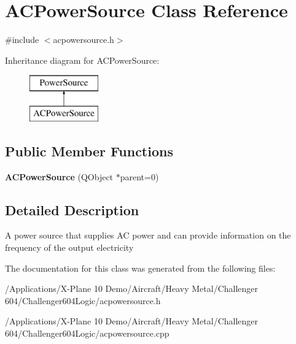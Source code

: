 \hypertarget{class_a_c_power_source}{\section{A\-C\-Power\-Source Class Reference}
\label{class_a_c_power_source}
}


{\ttfamily \#include $<$acpowersource.\-h$>$}

Inheritance diagram for A\-C\-Power\-Source\-:\begin{figure}[H]
\begin{center}
\leavevmode
\includegraphics[height=2.000000cm]{class_a_c_power_source}
\end{center}
\end{figure}
\subsection*{Public Member Functions}
\begin{DoxyCompactItemize}
\item 
\hypertarget{class_a_c_power_source_a3401dba80dc546f286f80031159dc592}{{\bfseries A\-C\-Power\-Source} (Q\-Object $\ast$parent=0)}\label{class_a_c_power_source_a3401dba80dc546f286f80031159dc592}

\end{DoxyCompactItemize}


\subsection{Detailed Description}
A power source that supplies A\-C power and can provide information on the frequency of the output electricity 

The documentation for this class was generated from the following files\-:\begin{DoxyCompactItemize}
\item 
/\-Applications/\-X-\/\-Plane 10 Demo/\-Aircraft/\-Heavy Metal/\-Challenger 604/\-Challenger604\-Logic/acpowersource.\-h\item 
/\-Applications/\-X-\/\-Plane 10 Demo/\-Aircraft/\-Heavy Metal/\-Challenger 604/\-Challenger604\-Logic/acpowersource.\-cpp\end{DoxyCompactItemize}
